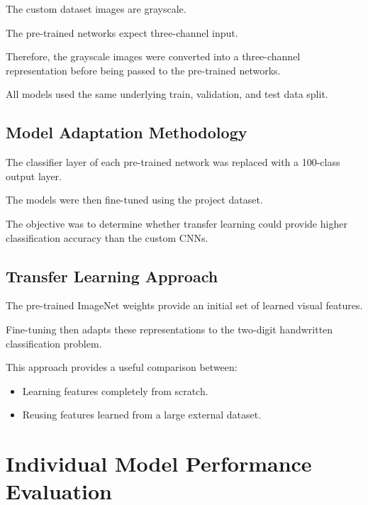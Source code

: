 \documentclass[12pt,a4paper]{report}
\begin{document}
The custom dataset images are grayscale.

The pre-trained networks expect three-channel input.

Therefore, the grayscale images were converted into a
three-channel representation before being passed to the
pre-trained networks.

All models used the same underlying train, validation, and test
data split.

\subsection{Model Adaptation Methodology}

The classifier layer of each pre-trained network was replaced
with a 100-class output layer.

The models were then fine-tuned using the project dataset.

The objective was to determine whether transfer learning could
provide higher classification accuracy than the custom CNNs.

\subsection{Transfer Learning Approach}

The pre-trained ImageNet weights provide an initial set of
learned visual features.

Fine-tuning then adapts these representations to the
two-digit handwritten classification problem.

This approach provides a useful comparison between:

\begin{itemize}
    \item Learning features completely from scratch.
    \item Reusing features learned from a large external dataset.
\end{itemize}

\section{Individual Model Performance Evaluation}
\end{document}
